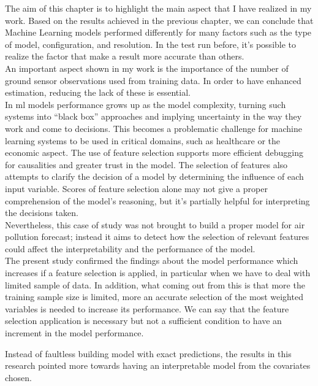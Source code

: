 The aim of this chapter is to highlight the main aspect that I have realized in my work.
Based on the results achieved in the previous chapter, we can conclude that Machine Learning models performed differently for many factors such as the type of model, configuration, and resolution.
In the test run before, it's possible to realize the factor that make a result more accurate than others.\\
An important aspect shown in my work is the importance of the number of ground sensor observations used from training data. In order to have enhanced estimation, reducing the lack of these is essential.\\
In \acrshort{ml} models performance grows up as the model complexity, turning such systems into “black box” approaches and implying uncertainty in the way they work and come to decisions. 
This becomes a problematic challenge for machine learning systems to be used in critical domains, such as healthcare or the economic aspect.
The use of feature selection supports more efficient debugging for causalities and greater trust in the model.
The selection of features also attempts to clarify the decision of a model by determining the influence of each input variable. 
Scores of feature selection alone may not give a proper comprehension of the model’s reasoning, but it's partially helpful for interpreting the decisions taken.\\
Nevertheless, this case of study was not brought to build a proper model for air pollution forecast; instead it aims to detect how the selection of relevant features could affect the interpretability and the performance of the model. \\
The present study confirmed the findings about the model performance which increases if a feature selection is applied, in particular when we have to deal with limited sample of data\cite{vabalas2019machine}. 
In addition, what coming out from this is that more the training sample size is limited, more an accurate selection of the most weighted variables is needed to increase its performance.
We can say that the feature selection application is necessary but not a sufficient condition to have an increment in the model performance.
\begin{comment}
In this work, so it is highlighted the effect of how the training in \acrshort{ml} should benefit from an accurate selection of variable. 
\end{comment}
Instead of faultless building model with exact predictions, the results in this research pointed more towards having an interpretable model from the covariates chosen. 
